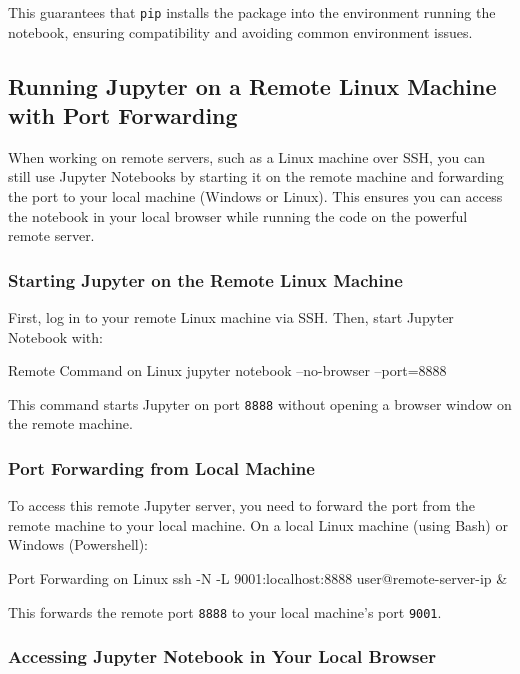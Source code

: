 This guarantees that \texttt{pip} installs the package into the environment running the notebook, ensuring compatibility and avoiding common environment issues.

%
\subsection{Running Jupyter on a Remote Linux Machine with Port Forwarding}

When working on remote servers, such as a Linux machine over SSH, you can still use Jupyter Notebooks by starting it on the remote machine and forwarding the port to your local machine (Windows or Linux). This ensures you can access the notebook in your local browser while running the code on the powerful remote server.

\subsubsection{Starting Jupyter on the Remote Linux Machine}

First, log in to your remote Linux machine via SSH. Then, start Jupyter Notebook with:
\begin{codeonly}{Remote Command on Linux}
jupyter notebook --no-browser --port=8888
\end{codeonly}

This command starts Jupyter on port \texttt{8888} without opening a browser window on the remote machine.

\subsubsection{Port Forwarding from Local Machine}

To access this remote Jupyter server, you need to forward the port from the remote machine to your local machine.
On a local Linux machine (using Bash) or Windows (Powershell):
\begin{codeonly}{Port Forwarding on Linux}
ssh -N -L 9001:localhost:8888 user@remote-server-ip &
\end{codeonly}

This forwards the remote port \texttt{8888} to your local machine’s port \texttt{9001}.


\subsubsection{Accessing Jupyter Notebook in Your Local Browser}

